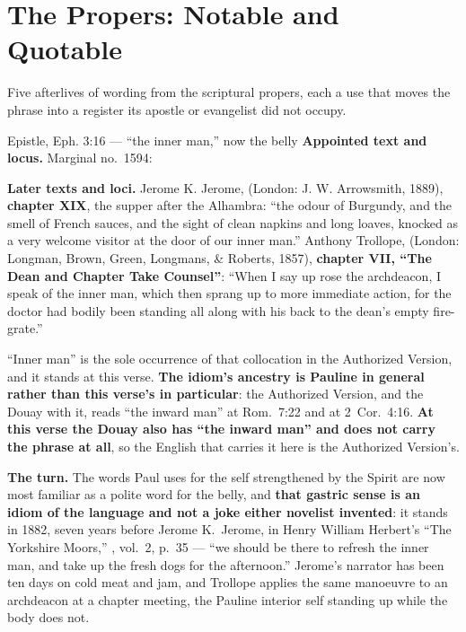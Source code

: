 \sectionguard
\section*{The Propers: Notable and Quotable}

Five afterlives of wording from the scriptural propers, each a use that moves
the phrase into a register its apostle or evangelist did not occupy.

\begin{afterlife}{Epistle, Eph. 3:16 --- ``the inner man,'' now the belly}
\textbf{Appointed text and locus.} Marginal no.~1594: 

\textbf{Later texts and loci.} Jerome K. Jerome,  (London: J. W. Arrowsmith, 1889), \textbf{chapter
XIX}, the supper after the Alhambra: ``the odour of Burgundy, and the smell of
French sauces, and the sight of clean napkins and long loaves, knocked as a very
welcome visitor at the door of our inner man.'' Anthony Trollope,  (London: Longman, Brown, Green, Longmans, \& Roberts, 1857),
\textbf{chapter VII, ``The Dean and Chapter Take Counsel''}: ``When I say up rose
the archdeacon, I speak of the inner man, which then sprang up to more immediate
action, for the doctor had bodily been standing all along with his back to the
dean's empty fire-grate.''

``Inner man'' is the sole occurrence of that collocation in the Authorized
Version, and it stands at this verse. \textbf{The idiom's ancestry is Pauline
in general rather than this verse's in particular}: the Authorized Version, and
the Douay with it, reads ``the inward man'' at Rom.~7:22 and at 2~Cor.~4:16.
\textbf{At this verse the Douay also has ``the inward man'' and does not carry
the phrase at all}, so the English that carries it here is the Authorized
Version's.

\textbf{The turn.} The words Paul uses for the self strengthened by the Spirit
are now most familiar as a polite word for the belly, and \textbf{that gastric
sense is an idiom of the language and not a joke either novelist invented}: it
stands in 1882, seven years before Jerome K.~Jerome, in Henry William Herbert's
``The Yorkshire Moors,'' , vol.~2,
p.~35 --- ``we should be there to refresh the inner man, and take up the fresh
dogs for the afternoon.'' Jerome's narrator has been ten days on cold meat and
jam, and Trollope applies the same manoeuvre to an archdeacon at a chapter
meeting, the Pauline interior self standing up while the body does not.
\end{afterlife}

